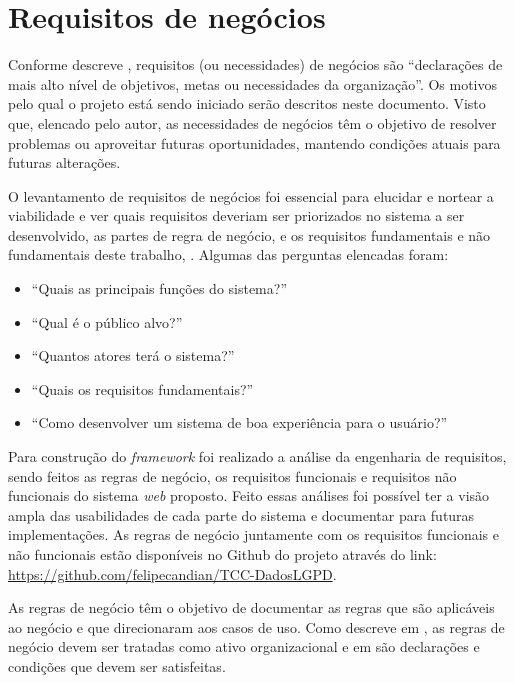 \documentclass[
	12pt,				%
	openright,			%
	oneside,			%
	a4paper,			%
	english,			%
	french,				%
	spanish,			%
	brazil,				%
	]{abntex2}
\begin{document}
\section{Requisitos de negócios}

Conforme descreve , requisitos (ou necessidades) de negócios são “declarações de mais alto nível de objetivos, metas ou necessidades da organização”.  Os motivos pelo qual o projeto está sendo iniciado serão descritos neste documento. Visto que, elencado pelo autor, as necessidades de negócios têm o objetivo de resolver problemas ou aproveitar futuras oportunidades, mantendo condições atuais para futuras alterações.

O levantamento de requisitos de negócios foi essencial para elucidar e nortear a viabilidade e ver quais requisitos deveriam ser priorizados no sistema a ser desenvolvido, as partes de regra de negócio, e os requisitos fundamentais e não fundamentais deste trabalho, \cite{Vazquez2016}. Algumas das perguntas elencadas foram:

\begin{itemize}
\item “Quais as principais funções do sistema?”
\item “Qual é o público alvo?”
\item “Quantos atores terá o sistema?”
\item “Quais os requisitos fundamentais?”
\item “Como desenvolver um sistema de boa experiência para o usuário?”
\end{itemize}

Para construção do \textit{framework}  foi realizado a análise da engenharia de requisitos, sendo feitos as regras de negócio, os requisitos funcionais e requisitos não funcionais do sistema \textit{web} proposto. Feito essas análises foi possível ter a visão ampla das usabilidades de cada parte do sistema e documentar para futuras implementações.  As regras de negócio juntamente com os requisitos funcionais e não funcionais estão disponíveis no Github do projeto através do link: \url{https://github.com/felipecandian/TCC-DadosLGPD}.

As regras de negócio têm o objetivo de documentar as regras que são aplicáveis ao negócio e que direcionaram aos casos de uso. Como descreve em , as regras de negócio devem ser tratadas como ativo organizacional e em \cite{Wazlawick2013} são declarações e condições que devem ser satisfeitas.
\end{document}
